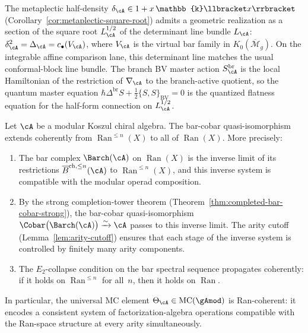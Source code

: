 \begin{conjecture}
\label{conj:conformal-block-half-form}
\ClaimStatusConjectured
{}
The metaplectic half-density
$\delta_\cA \in 1 + x\,\mathbb{k}\llbracket x \rrbracket$
\textup{(}Corollary~\textup{\ref{cor:metaplectic-square-root})}
admits a geometric realization as a section of the square root
$L_\cA^{1/2}$ of the determinant line bundle $L_\cA$:
$\delta_\cA^2 = \Delta_\cA = c_\bullet(V_\cA)$,
where $V_\cA$ is the virtual bar family in
$K_0(\overline{\mathcal{M}}_g)$.  On the integrable affine
comparison lane, this determinant line matches the usual
conformal-block line bundle.  The branch BV master action
$S_\cA^{\mathrm{br}}$ is the local Hamiltonian of the
restriction of $\nabla_\cA$ to the branch-active quotient,
so the quantum master equation
$\hbar\Delta^{\mathrm{br}} S + \frac{1}{2}
\{S, S\}_{\mathrm{BV}} = 0$
is the quantized flatness equation for the half-form connection
on $L_\cA^{1/2}$.
\end{conjecture}


\begin{theorem}
\label{thm:ran-coherent-bar-cobar}
\ClaimStatusProvedHere
{}
Let $\cA$ be a modular Koszul chiral algebra.  The bar-cobar
quasi-isomorphism extends coherently from $\operatorname{Ran}^{\leq n}(X)$
to all of $\operatorname{Ran}(X)$.  More precisely:
\begin{enumerate}[label=\textup{(\roman*)}]
\item The bar complex $\Barch(\cA)$ on $\operatorname{Ran}(X)$ is
  the inverse limit of its restrictions
  $\overline{B}^{\mathrm{ch},\leq n}(\cA)$ to $\operatorname{Ran}^{\leq n}(X)$, and
  this inverse system is compatible with the modular operad composition.
\item By the strong completion-tower theorem
  \textup{(}Theorem~\textup{\ref{thm:completed-bar-cobar-strong}}),
  the bar-cobar quasi-isomorphism
  $\Cobar\bigl(\Barch(\cA)\bigr) \xrightarrow{\sim} \cA$
  passes to this inverse limit.  The arity cutoff
  \textup{(}Lemma~\textup{\ref{lem:arity-cutoff}}) ensures that
  each stage of the inverse system is controlled by finitely many
  arity components.
\item The $E_2$-collapse condition on the bar spectral sequence
  propagates coherently: if it holds on
  $\operatorname{Ran}^{\leq n}$ for all~$n$, then it holds on
  $\operatorname{Ran}$.
\end{enumerate}
In particular, the universal MC element
$\Theta_\cA \in \mathrm{MC}(\gAmod)$ is Ran-coherent: it encodes
a consistent system of factorization-algebra operations compatible
with the Ran-space structure at every arity simultaneously.
\end{theorem}

